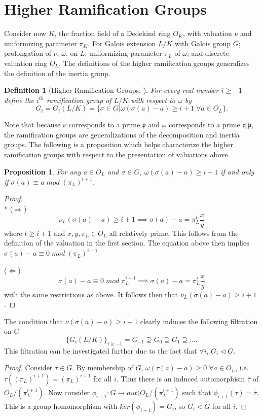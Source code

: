 \documentclass[paper=a4, fontsize=11pt]{scrartcl} %
\numberwithin{equation}{section} %
\numberwithin{figure}{section} %
\numberwithin{table}{section} %
\theoremstyle{break}
\newtheorem{defn}{Definition}
\newtheorem{prop}{Proposition}
\begin{document}
\section{Higher Ramification Groups}
Consider now $K$, the fraction field of a Dedekind ring $O_K$, with valuation $\nu$ and uniformizing parameter $\pi_K$. For Galois extension $L/K$ with Galois group $G$; prolongation of $\nu$, $\omega$, on $L$; uniformizing parameter $\pi_L$ of $\omega$; and discrete valuation ring $O_L$. The definitions of the higher ramification groups generalizes the definition of the inertia group.
\begin{defn}[Higher Ramification Groups, \cite{Serre}]
For every real number $i \geq -1$ define the $i^{th}$ ramification group of $L/K$ with respect to $\omega$ by
$$
G_i = G_i(L/K) = \{\sigma \in G | \omega(\sigma(a)-a)\geq i+1 \;\forall a \in O_L\}.
$$
\end{defn}
Note that because $\nu$ corresponds to a prime $\mathfrak{p}$ and $\omega$ corresponds to a prime $\mathfrak{q}|\mathfrak{p}$, the ramification groups are generalizations of the decomposition and inertia groups. The following is a proposition which helps characterize the higher ramification groups with respect to the presentation of valuations above.
\begin{prop}
For any $a \in O_L$ and $\sigma \in G$, $\omega(\sigma(a) - a) \geq i+1$ if and only if  $\sigma(a) \equiv a \; mod \; (\pi_L)^{i+1}$.
\end{prop}
\begin{proof}
\mbox{}\\*
($\Rightarrow$)
$$
\nu_L(\sigma(a)-a) \geq i+1 \implies \sigma(a)-a = \pi_L^{t}\frac{x}{y}
$$
where $t \geq i+1$ and $x,y,\pi_L\in O_L$ all relatively prime. This follows from the definition of the valuation in the first section. The equation above then implies $\sigma(a)-a \equiv 0 \; mod \; (\pi_L)^{i+1}$.

($\Leftarrow$) $$\sigma(a)-a \equiv 0 \; mod \; \pi_L^{i+1} \implies \sigma(a)-a = \pi_L^{t}\frac{x}{y}$$
with the same restrictions as above. It follows then that $\nu_L(\sigma(a)-a) \geq i+1$.
\end{proof}
The condition that $\nu(\sigma(a)-a) \geq i+1$ clearly induces the following filtration on $G$
$$
\{G_i(L/K)\}_{i\geq -1} = G_{-1} \supseteq G_0 \supseteq G_1 \supseteq \ldots.
$$
This filtration can be investigated further due to the fact that $\forall i$, $G_i \triangleleft G$.
\begin{proof} Consider $\tau \in G$. By membership of $G$, $\omega(\tau(a) - a) \geq 0\;\forall a\in O_L$, i.e. $\tau((\pi_L)^{i+1}) = (\pi_L)^{i+1}$ for all $i$. Thus there is an induced automorphism $\bar{\tau}$ of $O_L/(\pi_L^{i+1})$. Now consider $\phi_{i+1}:G \to aut(O_L/(\pi_L^{i+1})$ such that $\phi_{i+1}(\tau)=\bar{\tau}$. This is a group homomorphism with $ker(\phi_{i+1})=G_i$, so $G_i \triangleleft G$ for all $i$.
\end{proof} 
\end{document}
